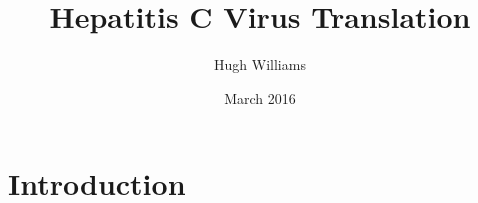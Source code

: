 \documentclass[a4paper,11pt]{article}
\begin{document}
	\title{Hepatitis C Virus Translation}
	\author{Hugh Williams}
	\date{March 2016}
	\maketitle

	\section*{Introduction}
	\lipsum[2] 
	\printbibliography
\end{document}
